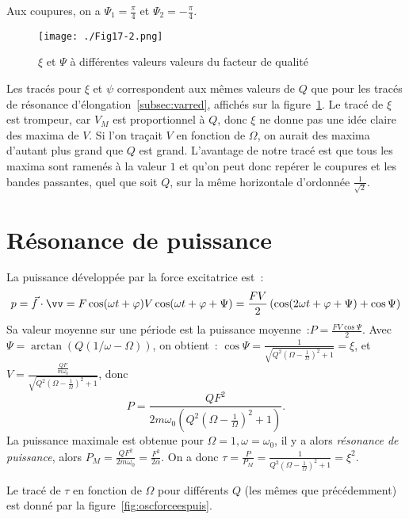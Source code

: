 Aux coupures, on a \(\Psi_1 = \frac{\pi}{4}\) et \(\Psi_2 = -\frac{\pi}{4}\).

\begin{figure}[!h]%
  \centering
  \texttt{[image: ./Fig17-2.png]}
  \caption{\(\xi\) et \(\Psi\) à différentes valeurs valeurs du facteur de
  qualité}
  \label{fig:oscforceesvit}
\end{figure}%

Les tracés pour \(\xi\) et \(\psi\) correspondent aux mêmes valeurs de \(Q\) 
que
pour les tracés de résonance d'élongation~\ref{subsec:varred}, affichés sur la
figure~\ref{fig:oscforceesvit}. Le tracé de \(\xi\) est trompeur, car \(V_M\)
est proportionnel à \(Q\), donc \(\xi\) ne donne pas une idée claire des maxima
de \(V\). Si l'on traçait \(V\) en fonction de \(\Omega\), on aurait des maxima
d'autant plus grand que \(Q\) est grand. L'avantage de notre tracé est que tous
les maxima sont ramenés à la valeur \(1\) et qu'on peut donc repérer le 
coupures
et les bandes passantes, quel que soit \(Q\), sur la même horizontale 
d'ordonnée
\(\frac{1}{\sqrt{2}}\).

\section{Résonance de puissance}%

La puissance développée par la force excitatrice est~:
\begin{equation}%
  p = \vec{f} \cdot \vv = F\cos(\omega t +\varphi) V\cos(\omega t + \varphi + 
  \Psi)
  = \frac{FV}{2}\left(\cos(2\omega t + \varphi + \Psi) + \cos \Psi\right)
\end{equation}%
Sa valeur moyenne sur une période est la \og{}puissance moyenne\fg{}~:\(P =
\frac{FV\cos\Psi}{2}\). Avec \(\Psi = \arctan(Q(1/\omega - \Omega))\), on%
obtient~: \(\cos \Psi =
\frac{1}{\sqrt{Q^2\left(\Omega-\frac{1}{\Omega}\right)^2+1}} = \xi\), et \(V =%
\frac{\frac{QF}{m\omega_0}}{\sqrt{Q^2\left(\Omega-\frac{1}{\Omega}\right)^2+1}}\),%
donc
\begin{equation}%
  P =
  \frac{QF^2}{2m\omega_0\left(Q^2\left(\Omega-\frac{1}{\Omega}\right)^2+1\right)}.
\end{equation}%
La puissance maximale est obtenue pour \(\Omega = 1, \omega = \omega_0\), il y 
a
alors \emph{résonance de puissance}, alors \(P_M = \frac{QF^2}{2m\omega_0} =
\frac{F^2}{2\alpha}\). On a donc \(\tau = \frac{P}{P_M} =%
\frac{1}{Q^2\left(\Omega-\frac{1}{\Omega}\right)^2+1} = \xi^2\).%

Le tracé de \(\tau\) en fonction de \(\Omega\) pour différents \(Q\) (les mêmes
que précédemment) est donné par la figure~\ref{fig:oscforceespuis}.

